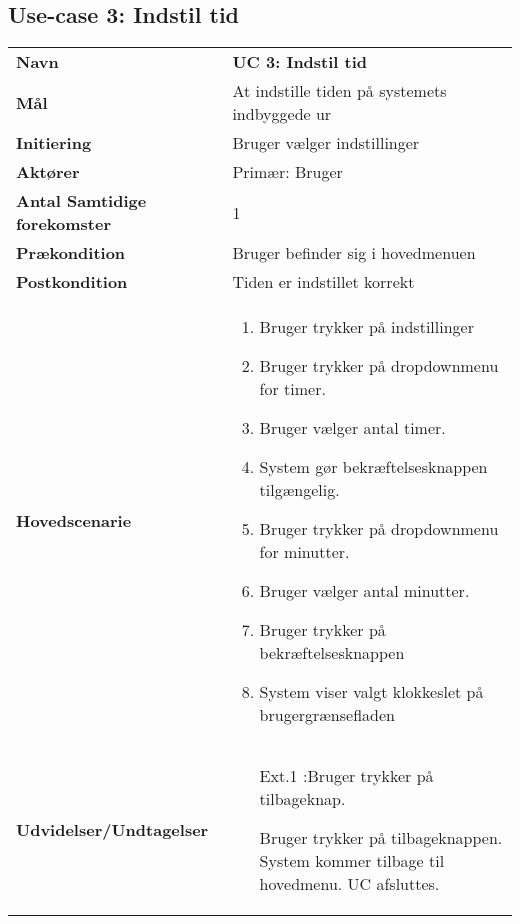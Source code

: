 \subsection{Use-case 3: Indstil tid}
\begin{tabular}{>{\bfseries}p{100pt} p{300pt}}
	Navn & \bfseries{UC 3: Indstil tid} \\
		Mål & At indstille tiden på systemets indbyggede ur\\
	Initiering & Bruger vælger indstillinger \\
	Aktører & Primær: Bruger \\
	Antal Samtidige forekomster & 1 \\
	Prækondition & Bruger befinder sig i hovedmenuen \\
	Postkondition & Tiden er indstillet korrekt \\
	Hovedscenarie & \begin{enumerate}
		\item Bruger trykker på indstillinger
		\item Bruger trykker på dropdownmenu for timer.
		\item Bruger vælger antal timer.
		\item System gør bekræftelsesknappen tilgængelig.
		\item Bruger trykker på dropdownmenu for minutter.
		\item Bruger vælger antal minutter.
		\item Bruger trykker på bekræftelsesknappen 
		\subitem [Ext. 1:Bruger trykker på tilbageknap.]
		\item System viser valgt klokkeslet på brugergrænsefladen
		
	\end{enumerate} \\
	Udvidelser/Undtagelser & 
	\begin{enumerate}{}{}
	\item[Ext.1]:Bruger trykker på tilbageknap.
	
		\subitem[1.1] Bruger trykker på tilbageknappen.
		\subitem[1.2] System kommer tilbage til hovedmenu.	 
		\subitem[1.3]UC afsluttes. \newline 
	\end{enumerate}
\end{tabular}